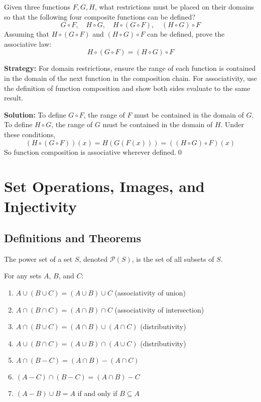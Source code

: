 \begin{problembox}
\begin{problemstatement}
Given three functions \( F, G, H \), what restrictions must be placed on their domains so that the following four composite functions can be defined?
\[
G \circ F, \quad H \circ G, \quad H \circ (G \circ F), \quad (H \circ G) \circ F
\]
Assuming that \( H \circ (G \circ F) \) and \( (H \circ G) \circ F \) can be defined, prove the associative law:
\[
H \circ (G \circ F) = (H \circ G) \circ F
\]
\end{problemstatement}
\end{problembox}

\noindent\textbf{Strategy:} For domain restrictions, ensure the range of each function is contained in the domain of the next function in the composition chain. For associativity, use the definition of function composition and show both sides evaluate to the same result.

\bigskip\noindent\textbf{Solution:}  
To define \( G \circ F \), the range of \( F \) must be contained in the domain of \( G \).  
To define \( H \circ G \), the range of \( G \) must be contained in the domain of \( H \).  
Under these conditions,  
\[
(H \circ (G \circ F))(x) = H(G(F(x))) = ((H \circ G) \circ F)(x)
\]  
So function composition is associative wherever defined.\qed

\section{Set Operations, Images, and Injectivity}

\subsection*{Definitions and Theorems}



\begin{definition}
The power set of a set $S$, denoted $\mathcal{P}(S)$, is the set of all subsets of $S$.
\end{definition}

\begin{theorem}
For any sets $A$, $B$, and $C$:
\begin{enumerate}
\item $A \cup (B \cup C) = (A \cup B) \cup C$ (associativity of union)
\item $A \cap (B \cap C) = (A \cap B) \cap C$ (associativity of intersection)
\item $A \cap (B \cup C) = (A \cap B) \cup (A \cap C)$ (distributivity)
\item $A \cup (B \cap C) = (A \cup B) \cap (A \cup C)$ (distributivity)
\item $A \cap (B - C) = (A \cap B) - (A \cap C)$
\item $(A - C) \cap (B - C) = (A \cap B) - C$
\item $(A - B) \cup B = A$ if and only if $B \subseteq A$
\end{enumerate}
\end{theorem}

